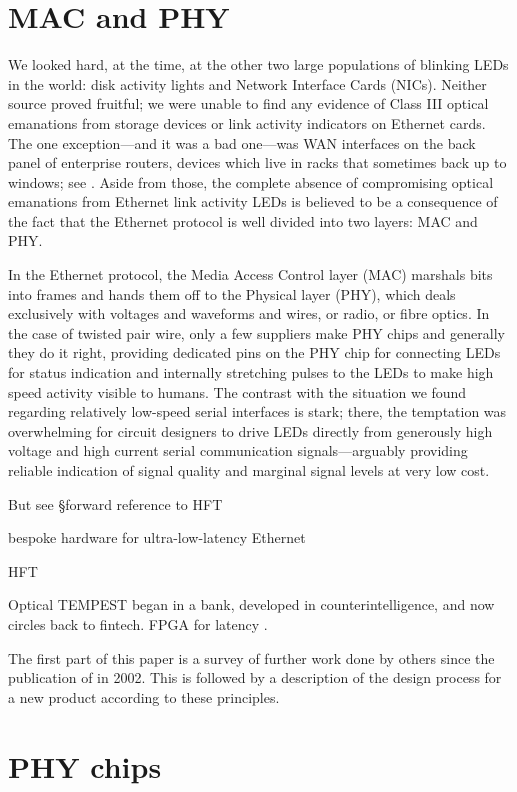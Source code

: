 \documentclass[conference]{IEEEtran}
\begin{document}
\section{MAC and PHY}

We looked hard, at the time, at the other two large populations of blinking
LEDs in the world: disk activity lights and Network Interface Cards (NICs).
Neither source proved fruitful; we were unable to find any evidence of Class
III optical emanations from storage devices or link activity indicators on
Ethernet cards. The one exception---and it was a bad one---was WAN interfaces
on the back panel of enterprise routers, devices which live in racks that
sometimes back up to windows; see \cite[\S 4.3.1]{Loughry2002a}. Aside from
those, the complete absence of compromising optical emanations from Ethernet
link activity LEDs is believed to be a consequence of the fact that the
Ethernet protocol is well divided into two layers: MAC and PHY.

In the Ethernet protocol, the Media Access Control layer (MAC) marshals bits
into frames and hands them off to the Physical layer (PHY), which deals
exclusively with voltages and waveforms and wires, or radio, or fibre optics.
In the case of twisted pair wire, only a few suppliers make PHY chips and
generally they do it right, providing dedicated pins on the PHY chip for
connecting LEDs for status indication and internally stretching pulses to the
LEDs to make high speed activity visible to humans. The contrast with the
situation we found regarding relatively low-speed serial interfaces is stark;
there, the temptation was overwhelming for circuit designers to drive LEDs
directly from generously high voltage and high current serial communication
signals---arguably providing reliable indication of signal quality and
marginal signal levels at very low cost.

But see \S forward reference to HFT

bespoke hardware for ultra-low-latency Ethernet

HFT

Optical TEMPEST began in a bank, developed in counterintelligence,
and now circles back to fintech. FPGA for latency \cite{Hurd2018a}.

The first part of this paper is a survey of further work done by others since
the publication of \cite{Loughry2002a} in 2002. This is followed by a
description of the design process for a new product according to these
principles.

\section{PHY chips}
\end{document}
